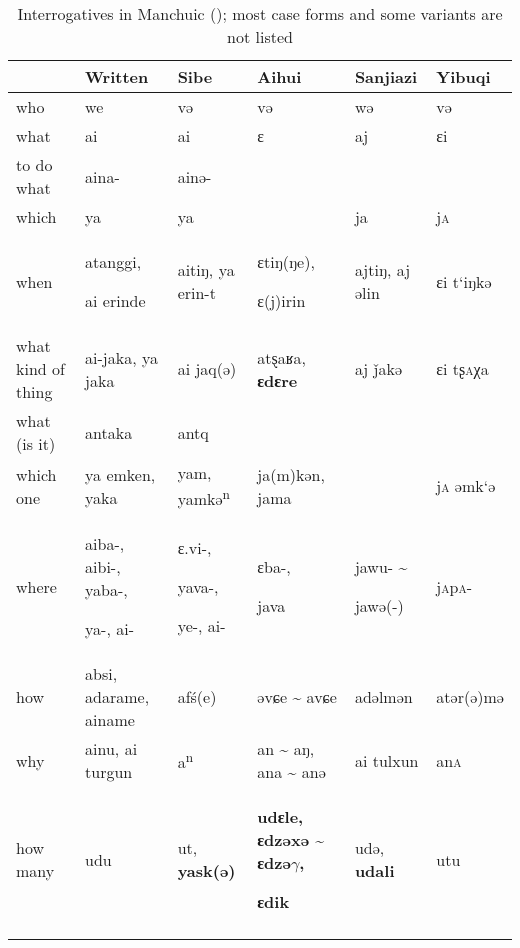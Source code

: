 \begin{table}[t]
\caption{Interrogatives in Manchuic (\citealt{Norman2013,Zikmundová2013,WangQingfeng2005,KimJuwon2008,ZhaoJie1989}); most case forms and some variants are not listed}
\label{tab:tungu:32}

\begin{tabularx}{\textwidth}{lQQQQl}
\lsptoprule
& \textbf{Written} & \textbf{Sibe} & \textbf{Aihui} & \textbf{Sanjiazi} & \textbf{Yibuqi}\\
\midrule
who & we & və & və & wə & və\\
what & ai & ai & ɛ & aj & ɛi\\
to do what & aina- & ainə- &  &  & \\
which & ya & ya &  & ja & j\textsc{a}\\
when & atanggi,

ai erinde & aitiŋ, ya erin-t & ɛtiŋ(ŋe),

ɛ(j)irin & ajtiŋ, aj əlin & ɛi t‘iŋkə\\
what kind of thing & ai-jaka, ya jaka & ai jaq(ə) & atȿaʁa, \textbf{ɛd}\textbf{ɛre} & aj ǰakə & ɛi tʂ\textsc{a}χa\\
what (is it) & antaka & antq &  &  & \\
which one & ya emken, yaka & yam, yamkə\textsuperscript{n} & ja(m)kən, jama &  & j\textsc{a} əmk‘ə\\
where & aiba-, aibi-, yaba-,

ya-, ai- & ɛ.vi-,

yava-,

ye-, ai- & ɛba-,

java & jawu- {\textasciitilde}

jawə(-) & j\textsc{a}p\textsc{a-}\\
how & absi, adarame, ainame & afś(e) & əvɕe {\textasciitilde} avɕe & adəlmən & atər(ə)mə\\
why & ainu, ai turgun & a\textsuperscript{n} & an {\textasciitilde} aŋ, ana {\textasciitilde} anə & ai tulxun & an\textsc{a}\\
how many & udu & ut, \textbf{yask(}\textbf{ə)} & \textbf{udɛ}\textbf{le, ɛ}\textbf{dzəxə {\textasciitilde}} \textbf{ɛdzə$\gamma $,}

\textbf{ɛdik} & udə, \textbf{udali} & utu\\
\lspbottomrule
\end{tabularx}
\end{table}

